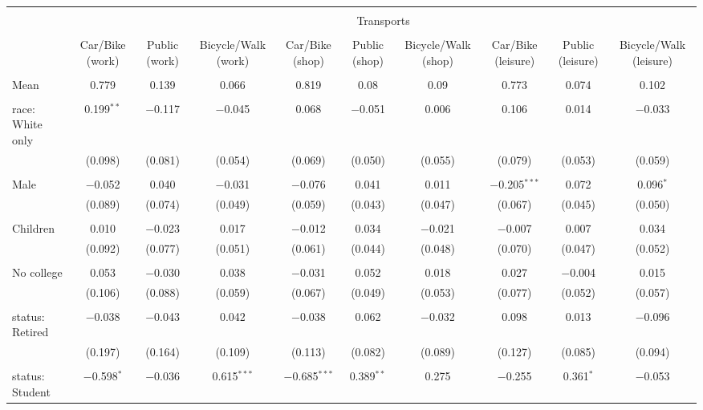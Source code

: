 
\begin{tabular}{@{\extracolsep{5pt}}lccccccccc} 
\\[-1.8ex]\hline 
\hline \\[-1.8ex] 
 & \multicolumn{9}{c}{Transports} \\ 
\cline{2-10} 
\\[-1.8ex] & Car/Bike (work) & Public (work) & Bicycle/Walk (work) & Car/Bike (shop) & Public (shop) & Bicycle/Walk (shop) & Car/Bike (leisure) & Public (leisure) & Bicycle/Walk (leisure) \\ 
\hline \\[-1.8ex] 
 Mean & 0.779 & 0.139 & 0.066 & 0.819 & 0.08 & 0.09 & 0.773 & 0.074 & 0.102  \\ \hline \\[-1.8ex] race: White only & 0.199$^{**}$ & $-$0.117 & $-$0.045 & 0.068 & $-$0.051 & 0.006 & 0.106 & 0.014 & $-$0.033 \\ 
  & (0.098) & (0.081) & (0.054) & (0.069) & (0.050) & (0.055) & (0.079) & (0.053) & (0.059) \\ 
  & & & & & & & & & \\ 
 Male & $-$0.052 & 0.040 & $-$0.031 & $-$0.076 & 0.041 & 0.011 & $-$0.205$^{***}$ & 0.072 & 0.096$^{*}$ \\ 
  & (0.089) & (0.074) & (0.049) & (0.059) & (0.043) & (0.047) & (0.067) & (0.045) & (0.050) \\ 
  & & & & & & & & & \\ 
 Children & 0.010 & $-$0.023 & 0.017 & $-$0.012 & 0.034 & $-$0.021 & $-$0.007 & 0.007 & 0.034 \\ 
  & (0.092) & (0.077) & (0.051) & (0.061) & (0.044) & (0.048) & (0.070) & (0.047) & (0.052) \\ 
  & & & & & & & & & \\ 
 No college & 0.053 & $-$0.030 & 0.038 & $-$0.031 & 0.052 & 0.018 & 0.027 & $-$0.004 & 0.015 \\ 
  & (0.106) & (0.088) & (0.059) & (0.067) & (0.049) & (0.053) & (0.077) & (0.052) & (0.057) \\ 
  & & & & & & & & & \\ 
 status: Retired & $-$0.038 & $-$0.043 & 0.042 & $-$0.038 & 0.062 & $-$0.032 & 0.098 & 0.013 & $-$0.096 \\ 
  & (0.197) & (0.164) & (0.109) & (0.113) & (0.082) & (0.089) & (0.127) & (0.085) & (0.094) \\ 
  & & & & & & & & & \\ 
 status: Student & $-$0.598$^{*}$ & $-$0.036 & 0.615$^{***}$ & $-$0.685$^{***}$ & 0.389$^{**}$ & 0.275 & $-$0.255 & 0.361$^{*}$ & $-$0.053 \\ 

\end{tabular}
